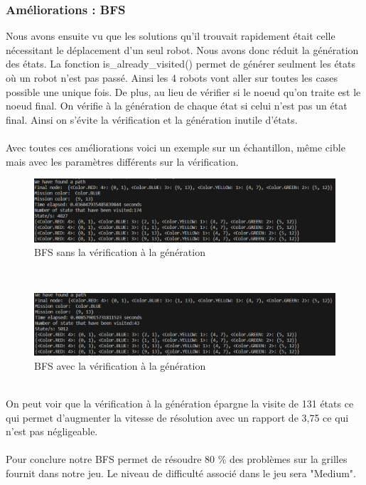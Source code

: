 \documentclass{article}
\begin{document}
\subsubsection{Améliorations : BFS}
Nous avons ensuite vu que les solutions qu'il trouvait rapidement était celle nécessitant le déplacement d'un seul robot. Nous avons donc réduit la génération des états. La fonction is\_already\_visited() permet de générer seulment les états où un robot n'est pas passé. Ainsi les 4 robots vont aller sur toutes les cases possible une unique fois. De plus, au lieu de vérifier si le noeud qu'on traite est le noeud final. On vérifie à la génération de chaque état si celui n'est pas un état final. Ainsi on s'évite la vérification et la génération inutile d'états.\\\\
Avec toutes ces améliorations voici un exemple sur un échantillon, même cible mais avec les paramètres différents sur la vérification.
\begin{figure}[!h]
  \centering  
  \includegraphics[width=1\textwidth]{sans_verif_generation.png}  
  \caption{BFS sans la vérification à la génération} 
  \label{fig:Diagram}  
\end{figure}\\
\begin{figure}[!h]
  \centering  
  \includegraphics[width=1\textwidth]{avec_verif_generation.png}  
  \caption{BFS avec la vérification à la génération} 
  \label{fig:Diagram}  
\end{figure}\\
On peut voir que la vérification à la génération épargne la visite de 131 états ce qui permet d'augmenter la vitesse de résolution avec un rapport de 3,75 ce qui n'est pas négligeable.\\\\
Pour conclure notre BFS permet de résoudre 80 \% des problèmes sur la grilles fournit dans notre jeu. Le niveau de difficulté associé dans le jeu sera "Medium".
\end{document}
